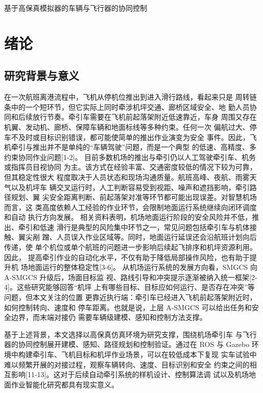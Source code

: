 





基于高保真模拟器的车辆与飞行器的协同控制
\section{绪论}

\subsection{研究背景与意义}

在一次航班离港流程中，飞机从停机位推出到进入滑行路线，看起来只是
周转链条中的一个短环节，但它实际上同时牵涉机坪交通、廊桥区域安全、地
勤人员协同和后续放行节奏。牵引车需要在飞机前起落架附近低速靠近，车身
周围又存在机翼、发动机、廊桥、保障车辆和地面标线等多种约束。任何一次
偏航过大、停车不及时或目标识别错误，都可能使简单的推出作业演变为安全
事件。因此，飞机牵引与推出并不是单纯的“车辆驾驶”问题，而是一个典型
的低速、高精度、多约束协同作业问题[1-2]。
目前多数机场的推出与牵引仍以人工驾驶牵引车、机务或指挥员目视协同
为主。该方式在经验丰富、交通密度较低的情况下较为可靠，但其稳定性很大
程度取决于人员状态和现场沟通质量。航班高峰、夜航、雨雾天气以及机坪车
辆交叉运行时，人工判断容易受到视距、噪声和遮挡影响，牵引路径规划、翼
尖安全距离判断、前起落架对准等环节都可能出现误差。对智慧机场而言，这
类高度依赖人工经验的作业环节，会限制地面运行系统继续向闭环调度和自动
执行方向发展。
相关资料表明，机场地面运行阶段的安全风险并不低，推出、牵引和低速
滑行是典型的风险集中环节之一，常见问题包括牵引车与机体接触、翼尖剐
蹭、人员误入作业区域等。同时，地面运行延误还会沿航班计划向后传递，使
单个机位或单个航班的问题进一步影响后续起飞排序和机坪资源利用。因此，
提高牵引作业的自动化水平，不仅有助于降低局部操作风险，也有助于提升机
场地面运行的整体稳定性[3-6]。
从机场运行系统的发展方向看，SMGCS 向 A-SMGCS 升级后，场面目标监
视、路线引导和冲突提示逐渐被纳入统一框架[2-4]。这些研究能够回答“机坪
上有哪些目标、目标应如何运行、是否存在冲突”等问题，但本文关注的位置
更靠近执行端：牵引车已经进入飞机前起落架附近时，如何控制转向、速度和
停车距离。也就是说，上层 A-SMGCS 可以给出任务和安全边界，而末端对接仍
需要车辆级建模、感知和控制方法支撑。






基于上述背景，本文选择以高保真仿真环境为研究支撑，围绕机场牵引车
与飞行器的协同控制展开建模、感知、路径规划和控制验证。通过在 ROS 与
Gazebo 环境中构建牵引车、飞机目标和机坪作业场景，可以在较低成本下复现
实车试验中难以频繁开展的对接过程，观察车辆转向、速度、目标识别和安全
约束之间的相互影响[11-13]。这对于后续自动牵引系统的样机设计、控制算法调
试以及机场地面作业智能化研究都具有现实意义。
